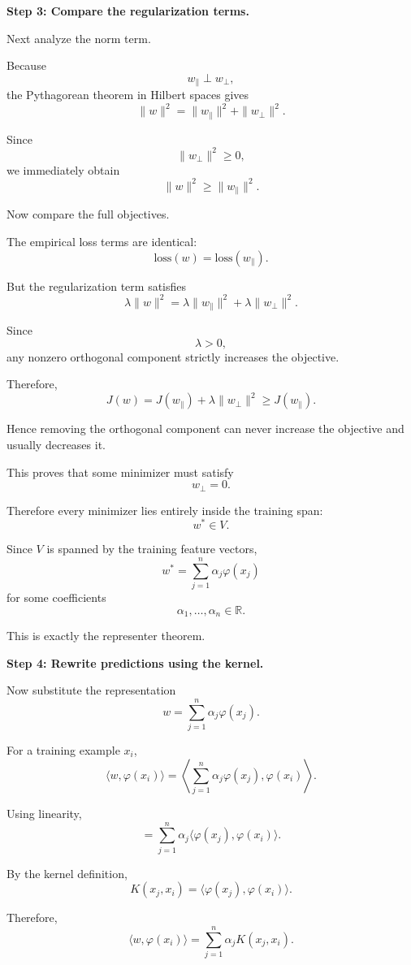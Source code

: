 \documentclass[11pt]{article}
\newcommand{\R}{\mathbb{R}}
\begin{document}
\begin{enumerate}
\begin{solutionbox}
\medskip

\textbf{Step 3: Compare the regularization terms.}

Next analyze the norm term.

Because
\[
w_{\parallel}\perp w_{\perp},
\]
the Pythagorean theorem in Hilbert spaces gives
\[
\|w\|^2
=
\|w_{\parallel}\|^2
+
\|w_{\perp}\|^2.
\]

Since
\[
\|w_{\perp}\|^2\ge0,
\]
we immediately obtain
\[
\|w\|^2
\ge
\|w_{\parallel}\|^2.
\]

Now compare the full objectives.

The empirical loss terms are identical:
\[
\mathrm{loss}(w)=\mathrm{loss}(w_{\parallel}).
\]

But the regularization term satisfies
\[
\lambda\|w\|^2
=
\lambda\|w_{\parallel}\|^2
+
\lambda\|w_{\perp}\|^2.
\]

Since
\[
\lambda>0,
\]
any nonzero orthogonal component strictly increases the objective.

Therefore,
\[
J(w)
=
J(w_{\parallel})
+
\lambda\|w_{\perp}\|^2
\ge
J(w_{\parallel}).
\]

Hence removing the orthogonal component can never increase the objective and usually decreases it.

This proves that some minimizer must satisfy
\[
w_{\perp}=0.
\]

Therefore every minimizer lies entirely inside the training span:
\[
w^*\in V.
\]

Since $V$ is spanned by the training feature vectors,
\[
\boxed{
w^*
=
\sum_{j=1}^n
\alpha_j\varphi(x_j)
}
\]
for some coefficients
\[
\alpha_1,\ldots,\alpha_n\in\R.
\]

This is exactly the representer theorem.

\medskip

\textbf{Step 4: Rewrite predictions using the kernel.}

Now substitute the representation
\[
w
=
\sum_{j=1}^n
\alpha_j\varphi(x_j).
\]

For a training example $x_i$,
\[
\langle w,\varphi(x_i)\rangle
=
\left\langle
\sum_{j=1}^n
\alpha_j\varphi(x_j),
\varphi(x_i)
\right\rangle.
\]

Using linearity,
\[
=
\sum_{j=1}^n
\alpha_j
\langle
\varphi(x_j),
\varphi(x_i)
\rangle.
\]

By the kernel definition,
\[
K(x_j,x_i)
=
\langle
\varphi(x_j),
\varphi(x_i)
\rangle.
\]

Therefore,
\[
\langle w,\varphi(x_i)\rangle
=
\sum_{j=1}^n
\alpha_jK(x_j,x_i).
\]


\end{solutionbox}
\end{enumerate}
\end{document}
